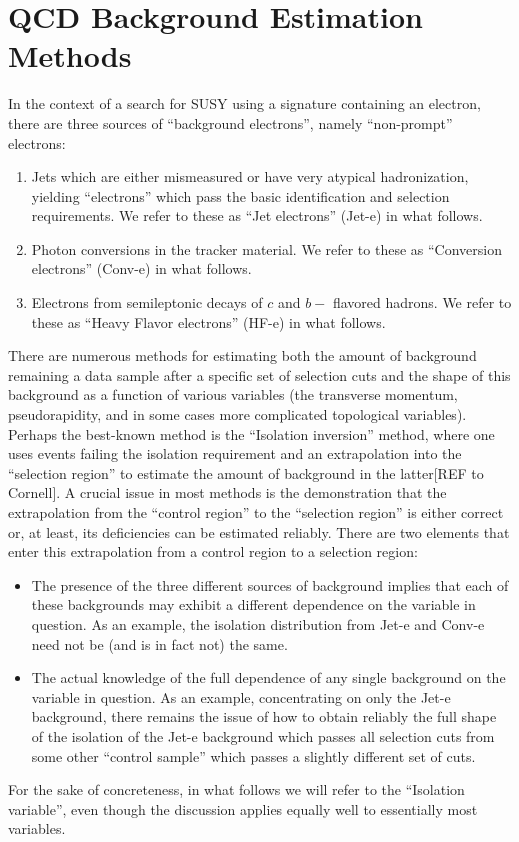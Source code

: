\section{QCD Background Estimation Methods}
\label{sec:QCD_bkgd_est}

In the context of a search for SUSY using a signature containing an electron, there are three sources of ``background electrons'', namely ``non-prompt'' electrons:
\begin{enumerate}
\item Jets which are either mismeasured or have very atypical hadronization, yielding ``electrons'' which pass the basic identification and selection requirements.  We refer to these as ``Jet electrons'' (Jet-e) in what follows.
\item Photon conversions in the tracker material.  We refer to these as ``Conversion electrons'' (Conv-e) in what follows.
\item Electrons from semileptonic decays of $c$ and $b-$ flavored hadrons.  We refer to these as ``Heavy Flavor electrons'' (HF-e) in what follows.
\end{enumerate}

There are numerous methods for estimating both the amount of background remaining a data sample after a specific set of selection cuts and the shape of this background as a function of various variables (the transverse momentum, pseudorapidity, and in some cases more complicated topological variables).  Perhaps the best-known method is the ``Isolation inversion'' method, where one uses events failing the isolation requirement and an extrapolation into the ``selection region'' to estimate the amount of background in the latter[REF to Cornell].  A crucial issue in most methods is the demonstration that the extrapolation from the ``control region'' to the ``selection region'' is either correct or, at least, its deficiencies can be estimated reliably.  There are two elements that enter this extrapolation from a control region to a selection region:
\begin{itemize}
\item The presence of the three different sources of background implies that each of these backgrounds may exhibit a different dependence on the variable in question.  As an example, the isolation distribution from Jet-e and Conv-e need not be (and is in fact not) the same.
\item The actual knowledge of the full dependence of any single background on the variable in question.  As an example, concentrating on only the Jet-e background, there remains the issue of how to obtain reliably the full shape of the isolation of the Jet-e background which passes all selection cuts from some other ``control sample'' which passes a slightly different set of cuts.
\end{itemize}
For the sake of concreteness, in what follows we will refer to the ``Isolation variable'', even though the discussion applies equally well to essentially most variables.

